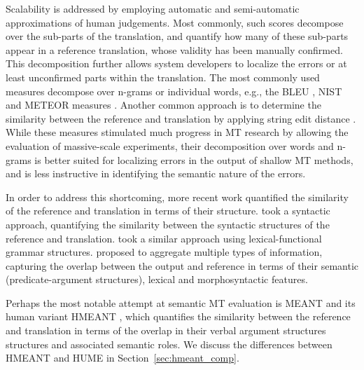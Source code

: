 \documentclass[11pt]{article}
\newcommand{\secref}[1]{Section~\ref{#1}}
\def\parcite#1{\cite{#1}}
\begin{document}
Scalability is addressed by employing automatic and semi-automatic approximations of human
judgements. Most commonly, such scores decompose over the sub-parts of
the translation, and quantify how many of these sub-parts appear in a reference translation,
whose validity has been manually confirmed. This decomposition further allows system developers
to localize the errors or at least unconfirmed parts within the translation.
The most commonly used measures decompose over n-grams or individual words, e.g., 
the BLEU \cite{Papineni:2002}, NIST \cite{Doddington:2002} and METEOR measures \cite{Banerjee:2005}.
Another common approach is to determine the similarity between the reference and translation
by applying string edit distance \cite{snover2006study}.
While these measures stimulated much progress in MT research by allowing
the evaluation of massive-scale experiments,
their decomposition over words and n-grams is better suited for localizing errors
in the output of shallow MT methods, and is less instructive in identifying the semantic
nature of the errors. 


In order to address this shortcoming, more recent work quantified
the similarity of the reference and translation in terms
of their structure.  took a syntactic approach, 
quantifying the similarity between the syntactic structures of the reference and translation.
 took a similar approach using lexical-functional grammar structures.
 proposed to aggregate multiple types of information,
capturing the overlap between the output and reference in terms of their
semantic (predicate-argument structures), lexical and morphosyntactic features.

Perhaps the most notable attempt at semantic MT evaluation is MEANT and
its human variant HMEANT \parcite{lo2011structured}, which quantifies the similarity between
the reference and translation in terms of the overlap in
their verbal argument structures structures and associated semantic roles.
We discuss the differences between HMEANT and HUME in \secref{sec:hmeant_comp}.
\end{document}
